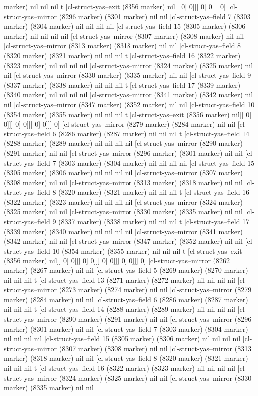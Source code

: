 {{marker) nil nil nil t [cl-struct-yas--exit (8356 marker) nil]] 0] 0]]] 0] 0]]] 0] [cl-struct-yas--mirror (8296 marker) (8301 marker) nil nil [cl-struct-yas--field 7 (8303 marker) (8304 marker) nil nil nil nil [cl-struct-yas--field 15 (8305 marker) (8306 marker) nil nil nil nil [cl-struct-yas--mirror (8307 marker) (8308 marker) nil nil [cl-struct-yas--mirror (8313 marker) (8318 marker) nil nil [cl-struct-yas--field 8 (8320 marker) (8321 marker) nil nil nil t [cl-struct-yas--field 16 (8322 marker) (8323 marker) nil nil nil nil [cl-struct-yas--mirror (8324 marker) (8325 marker) nil nil [cl-struct-yas--mirror (8330 marker) (8335 marker) nil nil [cl-struct-yas--field 9 (8337 marker) (8338 marker) nil nil nil t [cl-struct-yas--field 17 (8339 marker) (8340 marker) nil nil nil nil [cl-struct-yas--mirror (8341 marker) (8342 marker) nil nil [cl-struct-yas--mirror (8347 marker) (8352 marker) nil nil [cl-struct-yas--field 10 (8354 marker) (8355 marker) nil nil nil t [cl-struct-yas--exit (8356 marker) nil]] 0] 0]]] 0] 0]]] 0] 0]]] 0] [cl-struct-yas--mirror (8279 marker) (8284 marker) nil nil [cl-struct-yas--field 6 (8286 marker) (8287 marker) nil nil nil t [cl-struct-yas--field 14 (8288 marker) (8289 marker) nil nil nil nil [cl-struct-yas--mirror (8290 marker) (8291 marker) nil nil [cl-struct-yas--mirror (8296 marker) (8301 marker) nil nil [cl-struct-yas--field 7 (8303 marker) (8304 marker) nil nil nil nil [cl-struct-yas--field 15 (8305 marker) (8306 marker) nil nil nil nil [cl-struct-yas--mirror (8307 marker) (8308 marker) nil nil [cl-struct-yas--mirror (8313 marker) (8318 marker) nil nil [cl-struct-yas--field 8 (8320 marker) (8321 marker) nil nil nil t [cl-struct-yas--field 16 (8322 marker) (8323 marker) nil nil nil nil [cl-struct-yas--mirror (8324 marker) (8325 marker) nil nil [cl-struct-yas--mirror (8330 marker) (8335 marker) nil nil [cl-struct-yas--field 9 (8337 marker) (8338 marker) nil nil nil t [cl-struct-yas--field 17 (8339 marker) (8340 marker) nil nil nil nil [cl-struct-yas--mirror (8341 marker) (8342 marker) nil nil [cl-struct-yas--mirror (8347 marker) (8352 marker) nil nil [cl-struct-yas--field 10 (8354 marker) (8355 marker) nil nil nil t [cl-struct-yas--exit (8356 marker) nil]] 0] 0]]] 0] 0]]] 0] 0]]] 0] 0]]] 0] [cl-struct-yas--mirror (8262 marker) (8267 marker) nil nil [cl-struct-yas--field 5 (8269 marker) (8270 marker) nil nil nil t [cl-struct-yas--field 13 (8271 marker) (8272 marker) nil nil nil nil [cl-struct-yas--mirror (8273 marker) (8274 marker) nil nil [cl-struct-yas--mirror (8279 marker) (8284 marker) nil nil [cl-struct-yas--field 6 (8286 marker) (8287 marker) nil nil nil t [cl-struct-yas--field 14 (8288 marker) (8289 marker) nil nil nil nil [cl-struct-yas--mirror (8290 marker) (8291 marker) nil nil [cl-struct-yas--mirror (8296 marker) (8301 marker) nil nil [cl-struct-yas--field 7 (8303 marker) (8304 marker) nil nil nil nil [cl-struct-yas--field 15 (8305 marker) (8306 marker) nil nil nil nil [cl-struct-yas--mirror (8307 marker) (8308 marker) nil nil [cl-struct-yas--mirror (8313 marker) (8318 marker) nil nil [cl-struct-yas--field 8 (8320 marker) (8321 marker) nil nil nil t [cl-struct-yas--field 16 (8322 marker) (8323 marker) nil nil nil nil [cl-struct-yas--mirror (8324 marker) (8325 marker) nil nil [cl-struct-yas--mirror (8330 marker) (8335 marker) nil nil }}
